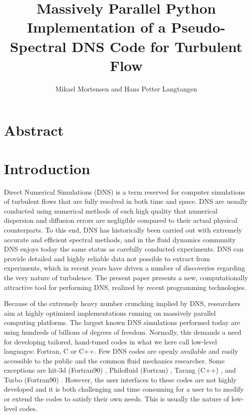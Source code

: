 \documentclass[11pt, oneside]{article}
\title{Massively Parallel Python Implementation of a Pseudo-Spectral DNS Code for Turbulent Flow}
\author{Mikael Mortensen and Hans Petter Langtangen}
\begin{document}
\maketitle
\section{Abstract}

\section{Introduction}
Direct Numerical Simulations (DNS) is a term reserved for computer simulations of turbulent flows that are fully resolved in both time and space. DNS are usually conducted using numerical methods of such high quality that numerical dispersion and diffusion errors are negligible compared to their actual physical counterparts. To this end, DNS has historically been carried out with extremely accurate and efficient spectral methods, and in the fluid dynamics community DNS enjoys  today the same status as carefully conducted experiments. DNS can provide detailed and highly reliable data not possible to extract from experiments, which in recent years have driven a number of discoveries regarding the very nature of turbulence. The present paper presents a new, computationally attractive tool for performing DNS, realized by recent programming technologies.

Because of the extremely heavy number crunching implied by DNS,
researchers aim at highly optimized implementations running on
massively parallel computing platforms. The largest known DNS
simulations performed today are using hundreds of billions of degrees
of freedom. Normally, this demands a need for developing tailored, hand-tuned
codes in what we here call low-level languages: Fortran, C or C++. Few
DNS codes are openly available and easily accessible to the public and
the common fluid mechanics researcher. Some exceptions are hit-3d
(Fortran90) \cite{hit-3d}, Philofluid (Fortran) \cite{philofluid},
Tarang (C++) \cite{tarang}, and Turbo (Fortran90)
\cite{turbo}. However, the user interfaces to these codes are not highly developed and it is both challenging and time consuming for a user to to modify or extend the codes to satisfy their own needs. This is usually the nature of low-level codes.
\end{document}

